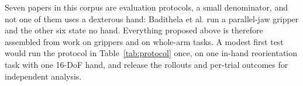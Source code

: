 Seven papers in this corpus are
evaluation protocols, a small denominator, and not one of them uses a dexterous hand: Badithela
et al. \cite{suresim_2025} run a parallel-jaw gripper and the other six state no hand.
Everything proposed above is therefore assembled from work on grippers and on whole-arm tasks.
A modest first test would run the protocol in Table~\ref{tab:protocol} once, on one in-hand
reorientation task with one 16-DoF hand, and release the rollouts and per-trial outcomes for
independent analysis.